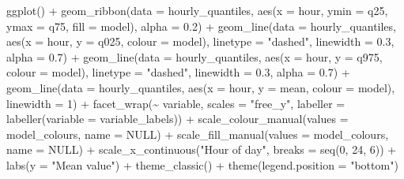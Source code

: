 \documentclass[
  letterpaper,
  DIV=11,
  numbers=noendperiod]{scrartcl}
\newenvironment{Shaded}{\begin{snugshade}}{\end{snugshade}}
\newcommand{\AttributeTok}[1]{\textcolor[rgb]{0.40,0.45,0.13}{#1}}
\newcommand{\ConstantTok}[1]{\textcolor[rgb]{0.56,0.35,0.01}{#1}}
\newcommand{\DecValTok}[1]{\textcolor[rgb]{0.68,0.00,0.00}{#1}}
\newcommand{\FloatTok}[1]{\textcolor[rgb]{0.68,0.00,0.00}{#1}}
\newcommand{\FunctionTok}[1]{\textcolor[rgb]{0.28,0.35,0.67}{#1}}
\newcommand{\NormalTok}[1]{\textcolor[rgb]{0.00,0.23,0.31}{#1}}
\newcommand{\SpecialCharTok}[1]{\textcolor[rgb]{0.37,0.37,0.37}{#1}}
\newcommand{\StringTok}[1]{\textcolor[rgb]{0.13,0.47,0.30}{#1}}
\begin{document}
\begin{Shaded}
\begin{Highlighting}[]
\FunctionTok{ggplot}\NormalTok{() }\SpecialCharTok{+}
  \FunctionTok{geom\_ribbon}\NormalTok{(}\AttributeTok{data =}\NormalTok{ hourly\_quantiles,}
              \FunctionTok{aes}\NormalTok{(}\AttributeTok{x =}\NormalTok{ hour, }\AttributeTok{ymin =}\NormalTok{ q25, }\AttributeTok{ymax =}\NormalTok{ q75, }\AttributeTok{fill =}\NormalTok{ model),}
              \AttributeTok{alpha =} \FloatTok{0.2}\NormalTok{) }\SpecialCharTok{+}
  \FunctionTok{geom\_line}\NormalTok{(}\AttributeTok{data =}\NormalTok{ hourly\_quantiles,}
            \FunctionTok{aes}\NormalTok{(}\AttributeTok{x =}\NormalTok{ hour, }\AttributeTok{y =}\NormalTok{ q025, }\AttributeTok{colour =}\NormalTok{ model),}
            \AttributeTok{linetype =} \StringTok{"dashed"}\NormalTok{, }\AttributeTok{linewidth =} \FloatTok{0.3}\NormalTok{, }\AttributeTok{alpha =} \FloatTok{0.7}\NormalTok{) }\SpecialCharTok{+}
  \FunctionTok{geom\_line}\NormalTok{(}\AttributeTok{data =}\NormalTok{ hourly\_quantiles,}
            \FunctionTok{aes}\NormalTok{(}\AttributeTok{x =}\NormalTok{ hour, }\AttributeTok{y =}\NormalTok{ q975, }\AttributeTok{colour =}\NormalTok{ model),}
            \AttributeTok{linetype =} \StringTok{"dashed"}\NormalTok{, }\AttributeTok{linewidth =} \FloatTok{0.3}\NormalTok{, }\AttributeTok{alpha =} \FloatTok{0.7}\NormalTok{) }\SpecialCharTok{+}
  \FunctionTok{geom\_line}\NormalTok{(}\AttributeTok{data =}\NormalTok{ hourly\_quantiles,}
            \FunctionTok{aes}\NormalTok{(}\AttributeTok{x =}\NormalTok{ hour, }\AttributeTok{y =}\NormalTok{ mean, }\AttributeTok{colour =}\NormalTok{ model),}
            \AttributeTok{linewidth =} \DecValTok{1}\NormalTok{) }\SpecialCharTok{+}
  \FunctionTok{facet\_wrap}\NormalTok{(}\SpecialCharTok{\textasciitilde{}}\NormalTok{ variable, }\AttributeTok{scales =} \StringTok{"free\_y"}\NormalTok{,}
             \AttributeTok{labeller =} \FunctionTok{labeller}\NormalTok{(}\AttributeTok{variable =}\NormalTok{ variable\_labels)) }\SpecialCharTok{+}
  \FunctionTok{scale\_colour\_manual}\NormalTok{(}\AttributeTok{values =}\NormalTok{ model\_colours, }\AttributeTok{name =} \ConstantTok{NULL}\NormalTok{) }\SpecialCharTok{+}
  \FunctionTok{scale\_fill\_manual}\NormalTok{(}\AttributeTok{values =}\NormalTok{ model\_colours, }\AttributeTok{name =} \ConstantTok{NULL}\NormalTok{) }\SpecialCharTok{+}
  \FunctionTok{scale\_x\_continuous}\NormalTok{(}\StringTok{"Hour of day"}\NormalTok{, }\AttributeTok{breaks =} \FunctionTok{seq}\NormalTok{(}\DecValTok{0}\NormalTok{, }\DecValTok{24}\NormalTok{, }\DecValTok{6}\NormalTok{)) }\SpecialCharTok{+}
  \FunctionTok{labs}\NormalTok{(}\AttributeTok{y =} \StringTok{"Mean value"}\NormalTok{) }\SpecialCharTok{+}
  \FunctionTok{theme\_classic}\NormalTok{() }\SpecialCharTok{+}
  \FunctionTok{theme}\NormalTok{(}\AttributeTok{legend.position =} \StringTok{"bottom"}\NormalTok{)}
\end{Highlighting}
\end{Shaded}
\end{document}
